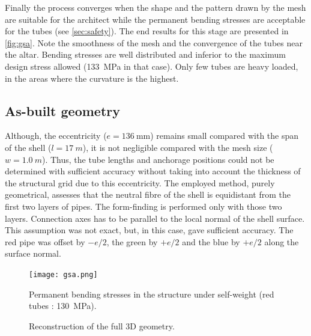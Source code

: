 Finally the process converges when the shape and the pattern drawn by the mesh are suitable for the architect while the permanent bending stresses are acceptable for the tubes (see \cref{sec:safety}). The end results for this stage are presented in \cref{fig:gsa}. Note the smoothness of the mesh and the convergence of the tubes near the altar. Bending stresses are well distributed and inferior to the maximum design stress allowed (\SI{133}{MPa} in that case). Only few tubes are heavy loaded, in the areas where the curvature is the highest.

\subsection{As-built geometry}\label{sec:asbuilt}
Although, the eccentricity ($e = \SI{136}{\mm}$) remains small compared with the span of the shell ($l =\SI{17}{m}$), it is not negligible compared with the mesh size ($w = \SI{1.0}{m}$). Thus, the tube lengths and anchorage positions could not be determined with sufficient accuracy without taking into account the thickness of the structural grid due to this eccentricity. The employed method, purely geometrical, assesses that the neutral fibre of the shell is equidistant from the first two layers of pipes. The form-finding is performed only with those two layers. Connection axes has to be parallel to the local normal of the shell surface. This assumption was not exact, but, in this case, gave sufficient accuracy. The red pipe was offset by $-e/2$, the green by $+e/2$ and the blue by $+e/2$ along the surface normal.
\begin{figure}[p]
     	\centering
	\begin{fullpage}
		\texttt{[image: gsa.png]}
		\caption[Permanent bending stresses in the structure under self-weight]{Permanent bending stresses in the structure under self-weight (red tubes : \SI{130}{MPa}).}
		\label{fig:gsa}
		\vspace{1.5cm}
		\hspace*{\fill}
		\vspace{0.5cm}
		\caption[Reconstruction of the full 3D geometry]{Reconstruction of the full 3D geometry.}
		\label{fig:eccentricity}    
	\end{fullpage}
\end{figure}
